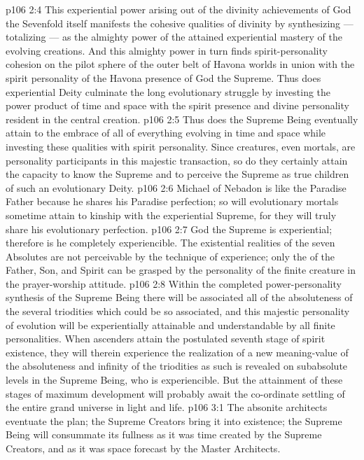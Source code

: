 \vs p106 2:4 This experiential power arising out of the divinity achievements of God the Sevenfold itself manifests the cohesive qualities of divinity by synthesizing --- totalizing --- as the almighty power of the attained experiential mastery of the evolving creations. And this almighty power in turn finds spirit\hyp{}personality cohesion on the pilot sphere of the outer belt of Havona worlds in union with the spirit personality of the Havona presence of God the Supreme. Thus does experiential Deity culminate the long evolutionary struggle by investing the power product of time and space with the spirit presence and divine personality resident in the central creation.
\vs p106 2:5 Thus does the Supreme Being eventually attain to the embrace of all of everything evolving in time and space while investing these qualities with spirit personality. Since creatures, even mortals, are personality participants in this majestic transaction, so do they certainly attain the capacity to know the Supreme and to perceive the Supreme as true children of such an evolutionary Deity.
\vs p106 2:6 \pc Michael of Nebadon is like the Paradise Father because he shares his Paradise perfection; so will evolutionary mortals sometime attain to kinship with the experiential Supreme, for they will truly share his evolutionary perfection.
\vs p106 2:7 \pc God the Supreme is experiential; therefore is he completely experiencible. The existential realities of the seven Absolutes are not perceivable by the technique of experience; only the  of the Father, Son, and Spirit can be grasped by the personality of the finite creature in the prayer\hyp{}worship attitude.
\vs p106 2:8 Within the completed power\hyp{}personality synthesis of the Supreme Being there will be associated all of the absoluteness of the several triodities which could be so associated, and this majestic personality of evolution will be experientially attainable and understandable by all finite personalities. When ascenders attain the postulated seventh stage of spirit existence, they will therein experience the realization of a new meaning\hyp{}value of the absoluteness and infinity of the triodities as such is revealed on subabsolute levels in the Supreme Being, who is experiencible. But the attainment of these stages of maximum development will probably await the co\hyp{}ordinate settling of the entire grand universe in light and life.
\vs p106 3:1 The absonite architects eventuate the plan; the Supreme Creators bring it into existence; the Supreme Being will consummate its fullness as it was time created by the Supreme Creators, and as it was space forecast by the Master Architects.
